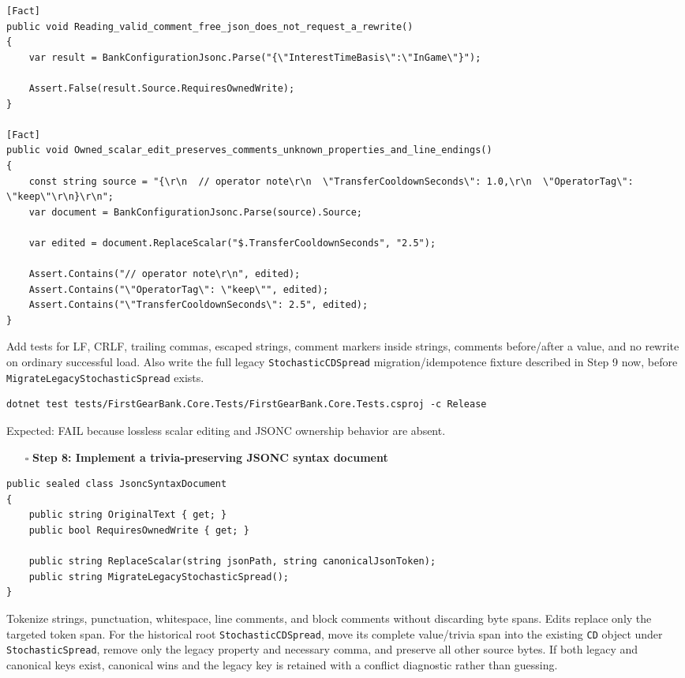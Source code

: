 \documentclass[
  10pt,
  letterpaper,
]{article}
\newcommand{\passthrough}[1]{#1}
\providecommand{\tightlist}{%
  \setlength{\itemsep}{0pt}\setlength{\parskip}{0pt}}
\begin{document}
\begin{lstlisting}
[Fact]
public void Reading_valid_comment_free_json_does_not_request_a_rewrite()
{
    var result = BankConfigurationJsonc.Parse("{\"InterestTimeBasis\":\"InGame\"}");

    Assert.False(result.Source.RequiresOwnedWrite);
}

[Fact]
public void Owned_scalar_edit_preserves_comments_unknown_properties_and_line_endings()
{
    const string source = "{\r\n  // operator note\r\n  \"TransferCooldownSeconds\": 1.0,\r\n  \"OperatorTag\": \"keep\"\r\n}\r\n";
    var document = BankConfigurationJsonc.Parse(source).Source;

    var edited = document.ReplaceScalar("$.TransferCooldownSeconds", "2.5");

    Assert.Contains("// operator note\r\n", edited);
    Assert.Contains("\"OperatorTag\": \"keep\"", edited);
    Assert.Contains("\"TransferCooldownSeconds\": 2.5", edited);
}
\end{lstlisting}

Add tests for LF, CRLF, trailing commas, escaped strings, comment
markers inside strings, comments before/after a value, and no rewrite on
ordinary successful load. Also write the full legacy
\passthrough{\lstinline!StochasticCDSpread!} migration/idempotence
fixture described in Step 9 now, before
\texttt{MigrateLegacyStochasticSpread} exists.

\begin{lstlisting}
dotnet test tests/FirstGearBank.Core.Tests/FirstGearBank.Core.Tests.csproj -c Release
\end{lstlisting}

Expected: FAIL because lossless scalar editing and JSONC ownership
behavior are absent.

\begin{itemize}
\tightlist
\item[$\square$]
  \textbf{Step 8: Implement a trivia-preserving JSONC syntax document}
\end{itemize}

\begin{lstlisting}
public sealed class JsoncSyntaxDocument
{
    public string OriginalText { get; }
    public bool RequiresOwnedWrite { get; }

    public string ReplaceScalar(string jsonPath, string canonicalJsonToken);
    public string MigrateLegacyStochasticSpread();
}
\end{lstlisting}

Tokenize strings, punctuation, whitespace, line comments, and block
comments without discarding byte spans. Edits replace only the targeted
token span. For the historical root
\passthrough{\lstinline!StochasticCDSpread!}, move its complete
value/trivia span into the existing \passthrough{\lstinline!CD!} object
under \passthrough{\lstinline!StochasticSpread!}, remove only the legacy
property and necessary comma, and preserve all other source bytes. If
both legacy and canonical keys exist, canonical wins and the legacy key
is retained with a conflict diagnostic rather than guessing.
\end{document}
